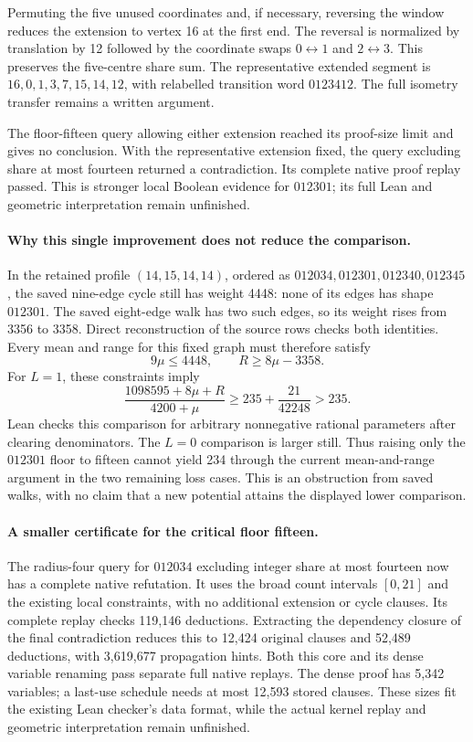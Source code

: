 \documentclass[11pt,a4paper]{article}
\begin{document}
Permuting the five unused coordinates and, if necessary, reversing the
window reduces the extension to vertex 16 at the first end. The reversal
is normalized by translation by 12 followed by the coordinate swaps
$0\leftrightarrow1$ and $2\leftrightarrow3$. This preserves the five-centre
share sum. The representative extended segment is
$16,0,1,3,7,15,14,12$, with relabelled transition word $0123412$.
The full isometry transfer remains a written argument.

The floor-fifteen query allowing either extension reached its proof-size
limit and gives no conclusion. With the representative extension fixed,
the query excluding share at most fourteen returned a contradiction.
Its complete native proof replay passed. This is stronger local Boolean
evidence for $012301$; its full Lean and geometric interpretation remain
unfinished.

\paragraph{Why this single improvement does not reduce the comparison.}
In the retained profile $(14,15,14,14)$, ordered as
$012034,012301,012340,012345$, the saved nine-edge cycle still has weight
4448: none of its edges has shape $012301$. The saved eight-edge walk
has two such edges, so its weight rises from 3356 to 3358. Direct
reconstruction of the source rows checks both identities. Every mean
and range for this fixed graph must therefore satisfy
\[
9\mu\le4448,\qquad R\ge8\mu-3358.
\]
For $L=1$, these constraints imply
\[
\frac{1098595+8\mu+R}{4200+\mu}
\ge235+\frac{21}{42248}>235.
\]
Lean checks this comparison for arbitrary nonnegative rational parameters
after clearing denominators. The $L=0$ comparison is larger still.
Thus raising only the $012301$ floor to fifteen cannot yield 234 through
the current mean-and-range argument in the two remaining loss cases.
This is an obstruction from saved walks, with no claim that a new
potential attains the displayed lower comparison.

\paragraph{A smaller certificate for the critical floor fifteen.}
The radius-four query for $012034$ excluding integer share at most fourteen
now has a complete native refutation. It uses the broad count intervals
$[0,21]$ and the existing local constraints, with no additional extension
or cycle clauses. Its complete replay checks 119,146 deductions.
Extracting the dependency closure of the final contradiction reduces this
to 12,424 original clauses and 52,489 deductions, with 3,619,677 propagation
hints. Both this core and its dense variable renaming pass separate full
native replays. The dense proof has 5,342 variables; a last-use schedule
needs at most 12,593 stored clauses. These sizes fit the existing Lean
checker's data format, while the actual kernel replay and geometric
interpretation remain unfinished.
\end{document}
